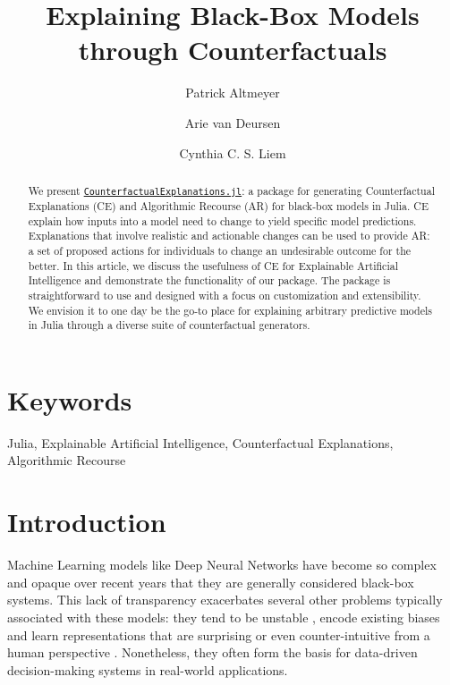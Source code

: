 \documentclass{juliacon}
\title{Explaining Black-Box Models through Counterfactuals}
\author[1]{Patrick Altmeyer}
\author[1]{Arie van Deursen}
\author[1]{Cynthia C. S. Liem}
\affil[1]{Delft University of Technology}
\date{}
\providecommand{\JCONkeywords}[1]
{
  \small	
  \section*{Keywords} #1
}
\begin{document}
\maketitle

\begin{abstract}

We present
\href{https://github.com/JuliaTrustworthyAI/CounterfactualExplanations.jl}{\texttt{CounterfactualExplanations.jl}}:
a package for generating Counterfactual Explanations (CE) and
Algorithmic Recourse (AR) for black-box models in Julia. CE explain how
inputs into a model need to change to yield specific model predictions.
Explanations that involve realistic and actionable changes can be used
to provide AR: a set of proposed actions for individuals to change an
undesirable outcome for the better. In this article, we discuss the
usefulness of CE for Explainable Artificial Intelligence and demonstrate
the functionality of our package. The package is straightforward to use
and designed with a focus on customization and extensibility. We
envision it to one day be the go-to place for explaining arbitrary
predictive models in Julia through a diverse suite of counterfactual
generators.
\end{abstract}

\JCONkeywords{Julia, Explainable Artificial Intelligence, Counterfactual
Explanations, Algorithmic Recourse}


\setcounter{page}{1}

\ifdefined\Shaded\renewenvironment{Shaded}{\begin{tcolorbox}[sharp corners, borderline west={3pt}{0pt}{shadecolor}, frame hidden, breakable, boxrule=0pt, interior hidden, enhanced]}{\end{tcolorbox}}\fi

\hypertarget{sec-intro}{%
\section{Introduction}\label{sec-intro}}

Machine Learning models like Deep Neural Networks have become so complex
and opaque over recent years that they are generally considered
black-box systems. This lack of transparency exacerbates several other
problems typically associated with these models: they tend to be
unstable \autocite{goodfellow2014explaining}, encode existing biases
\autocite{buolamwini2018gender} and learn representations that are
surprising or even counter-intuitive from a human perspective
\autocite{buolamwini2018gender}. Nonetheless, they often form the basis
for data-driven decision-making systems in real-world applications.
\end{document}
